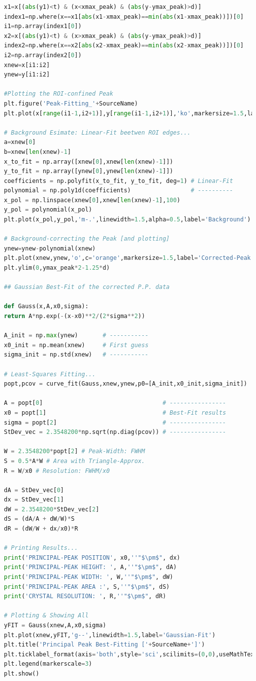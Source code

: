 \begin{lstlisting}[language=python, style=Pystyle, caption=\texttt{Python} code for Spectral Peak Recognition Routine, label=list:PeakRoutine, 	captionpos=t]
x1=x[(abs(y1)<t) & (x<xmax_peak) & (abs(y-ymax_peak)>d)]
index1=np.where(x==x1[abs(x1-xmax_peak)==min(abs(x1-xmax_peak))])[0]
i1=np.array(index1[0])
x2=x[(abs(y1)<t) & (x>xmax_peak) & (abs(y-ymax_peak)>d)]
index2=np.where(x==x2[abs(x2-xmax_peak)==min(abs(x2-xmax_peak))])[0]
i2=np.array(index2[0])
xnew=x[i1:i2]
ynew=y[i1:i2]

#Plotting the ROI-confined Peak
plt.figure('Peak-Fitting_'+SourceName)
plt.plot(x[range(i1-1,i2+1)],y[range(i1-1,i2+1)],'ko',markersize=1.5,label='ROI-data')

# Background Esimate: Linear-Fit beetwen ROI edges... 
a=xnew[0]
b=xnew[len(xnew)-1]
x_to_fit = np.array([xnew[0],xnew[len(xnew)-1]])
y_to_fit = np.array([ynew[0],ynew[len(xnew)-1]])
coefficients = np.polyfit(x_to_fit, y_to_fit, deg=1) # Linear-Fit
polynomial = np.poly1d(coefficients)                 # ----------
x_pol = np.linspace(xnew[0],xnew[len(xnew)-1],100)
y_pol = polynomial(x_pol)
plt.plot(x_pol,y_pol,'m-.',linewidth=1.5,alpha=0.5,label='Background')

# Background-correcting the Peak [and plotting]
ynew=ynew-polynomial(xnew)
plt.plot(xnew,ynew,'o',c='orange',markersize=1.5,label='Corrected-Peak')
plt.ylim(0,ymax_peak*2-1.25*d)

## Gaussian Best-Fit of the corrected P.P. data

def Gauss(x,A,x0,sigma):
return A*np.exp(-(x-x0)**2/(2*sigma**2))

A_init = np.max(ynew)       # -----------
x0_init = np.mean(xnew)     # First guess
sigma_init = np.std(xnew)   # -----------

# Least-Squares Fitting...
popt,pcov = curve_fit(Gauss,xnew,ynew,p0=[A_init,x0_init,sigma_init])

A = popt[0]                                  # ----------------
x0 = popt[1]                                 # Best-Fit results
sigma = popt[2]                              # ----------------
StDev_vec = 2.3548200*np.sqrt(np.diag(pcov)) # ----------------

W = 2.3548200*popt[2] # Peak-Width: FWHM
S = 0.5*A*W # Area with Triangle-Approx.
R = W/x0 # Resolution: FWHM/x0

dA = StDev_vec[0]
dx = StDev_vec[1]
dW = 2.3548200*StDev_vec[2]
dS = (dA/A + dW/W)*S
dR = (dW/W + dx/x0)*R

# Printing Results...
print('PRINCIPAL-PEAK POSITION', x0,''"$\pm$", dx)
print('PRINCIPAL-PEAK HEIGHT: ', A,''"$\pm$", dA)
print('PRINCIPAL-PEAK WIDTH: ', W,''"$\pm$", dW)
print('PRINCIPAL-PEAK AREA :', S,''"$\pm$", dS)
print('CRYSTAL RESOLUTION: ', R,''"$\pm$", dR)

# Plotting & Showing All
yFIT = Gauss(xnew,A,x0,sigma)
plt.plot(xnew,yFIT,'g--',linewidth=1.5,label='Gaussian-Fit')
plt.title('Principal Peak Best-Fitting ['+SourceName+']')
plt.ticklabel_format(axis='both',style='sci',scilimits=(0,0),useMathText=True)
plt.legend(markerscale=3)
plt.show()
\end{lstlisting}

